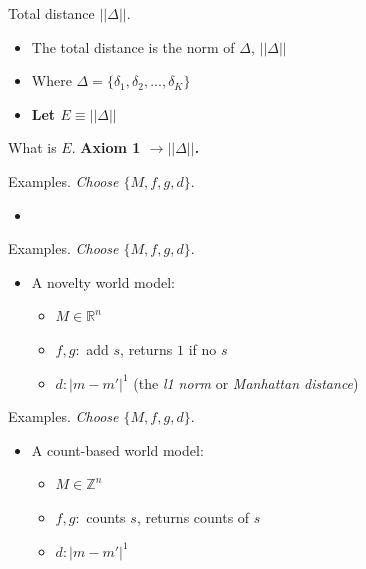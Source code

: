 \documentclass[10pt]{beamer}
\begin{document}
\begin{frame}[fragile]{Total distance $||\Delta||$.}
\begin{itemize}
\item The total distance is the norm of $\Delta$, $||\Delta||$
\item Where $\Delta = \{\delta_1, \delta_2,...,\delta_K\}$
\item \textbf{Let $E \equiv ||\Delta||$}
\end{itemize}
\end{frame}

\begin{frame}[fragile]{What is $E$.}
\textbf{Axiom 1 $\rightarrow ||\Delta||$.}
\end{frame}

\begin{frame}[fragile]{Examples.}
\textit{Choose $\{M, f, g, d\}$}.
\begin{itemize}
    \item 
\end{itemize}
\end{frame}

\begin{frame}[fragile]{Examples.}
\textit{Choose $\{M, f, g, d\}$}.
\begin{itemize}
    \item A novelty world model:
    \begin{itemize}
        \item $M \in \mathbb{R}^n$
        \item $f,g: $ add $s$, returns $1$ if no $s$ 
        \item $d: |m - m'|^1$ (the \textit{l1 norm} or \textit{Manhattan distance})
    \end{itemize}
\end{itemize}
\end{frame}

\begin{frame}[fragile]{Examples.}
\textit{Choose $\{M, f, g, d\}$}.
\begin{itemize}
    \item A count-based world model:
    \begin{itemize}
        \item $M \in \mathbb{Z}^n$
        \item $f,g: $ counts $s$, returns counts of $s$
        \item $d: |m - m'|^1$ 
    \end{itemize}
\end{itemize}
\end{frame}
\end{document}
